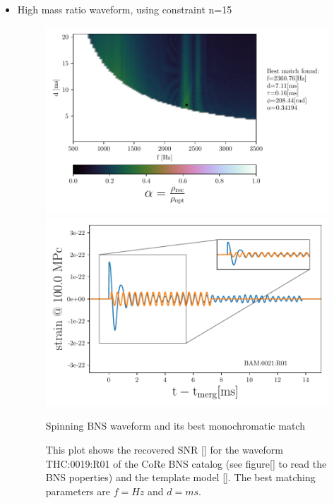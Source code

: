 \begin{itemize}[leftmargin=*]


\item High mass ratio waveform, using constraint n=15

\begin{figure}[!htbp]
\begin{center}
\begin{minipage}[t]{0.5\linewidth}
\vspace{0pt}
\includegraphics[scale=0.6,trim={2mm 0 35mm 0},clip]{images/Data_analysis/results/2D_grid_13.pdf}
\end{minipage}%
\begin{minipage}[t]{0.5\linewidth}
\vspace{20pt}
\includegraphics[scale=0.45]{images/Data_analysis/results/2D_grid_14.pdf}
\end{minipage}
\captionsetup{width=0.8\textwidth}
\caption{Spinning BNS waveform and its best monochromatic match}
\caption*{This plot shows the recovered SNR \ref{} for the waveform THC:0019:R01 of the CoRe BNS catalog \cite{}(see figure\ref{} to read the BNS poperties) and the template model \ref{}. The best matching parameters are $f=Hz$ and $d=ms$.}
\end{center}
\end{figure}


\end{itemize}
